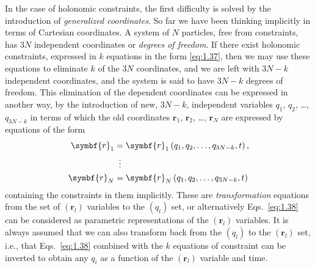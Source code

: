 In the case of holonomic constraints, the first difficulty is solved by the introduction of \emph{generalized coordinates}. So far we have been thinking implicitly in terms of Cartesian coordinates. A system of \(N\) particles, free from constraints, has \(3N\) independent coordinates or \emph{degrees of freedom}. If there exist holonomic constraints, expressed in \(k\) equations in the form \eqref{eq:1.37}, then we may use these equations to eliminate \(k\) of the \(3N\) coordinates, and we are left with \(3N-k\) independent coordinates, and the system is said to have \(3N-k\) degrees of freedom. This elimination of the dependent coordinates can be expressed in another way, by the introduction of new, \(3N-k\), independent variables \(q_1\), \(q_2\), \ldots, \(q_{3N-k}\) in terms of which the old coordinates \(\symbf{r}_1\), \(\symbf{r}_2\), \ldots, \(\symbf{r}_N\) are expressed by equations of the form
\begin{equation}
    \begin{aligned}
        \symbf{r}_1&=\symbf{r}_1\left(q_1,q_2,\ldots,q_{3N-k},t\right),\\
        &\vdotswithin{=}\\
        \symbf{r}_N&=\symbf{r}_N\left(q_1,q_2,\ldots,q_{3N-k},t\right)
    \end{aligned}
    \label{eq:1.38}
\end{equation}
containing the constraints in them implicitly. These are \emph{transformation} equations from the set of \(\left(\symbf{r}_l\right)\) variables to the \(\left(q_l\right)\) set, or alternatively Eqs.~\eqref{eq:1.38} can be considered as parametric representations of the \(\left(\symbf{r}_l\right)\) variables. It is always assumed that we can also transform back from the \(\left(q_l\right)\) to the \(\left(\symbf{r}_l\right)\) set, i.e., that Eqs.~\eqref{eq:1.38} combined with the \(k\) equations of constraint can be inverted to obtain any \(q_i\) as a function of the \(\left(\symbf{r}_l\right)\) variable and time.

